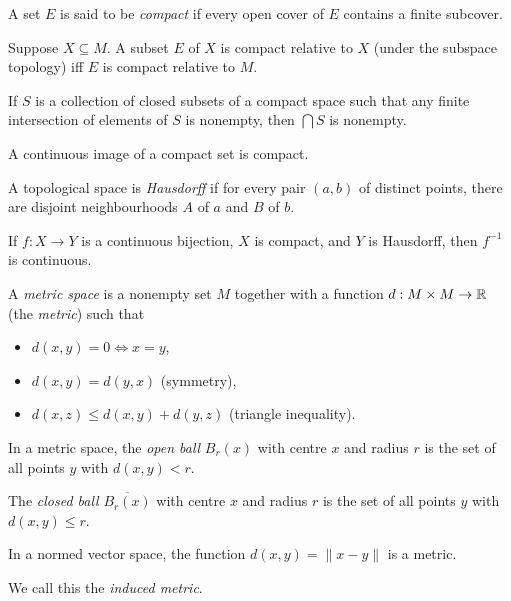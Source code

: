\begin{defn}
    A set $E$ is said to be \emph{compact} if every open cover of $E$ contains a
    finite subcover.
\end{defn}
\begin{prop}
  Suppose $X\subseteq M$. A subset $E$ of $X$ is compact
  relative to $X$ (under the subspace topology) iff $E$ is compact relative to $M$.
\end{prop}
\begin{prop}
  If $S$ is a collection of closed subsets of a compact space such that any
  finite intersection of elements of $S$ is nonempty, then $\bigcap S$ is
  nonempty.
\end{prop}
\begin{prop}
    A continuous image of a compact set is compact.
\end{prop}
\begin{defn}
    A topological space is \emph{Hausdorff} if for every pair $(a,b)$ of
    distinct points, there are disjoint neighbourhoods $A$ of $a$ and $B$ of $b$.
\end{defn}
\begin{prop}
    If $f:X\to Y$ is a continuous bijection, $X$ is compact, and $Y$ is
    Hausdorff, then $f^{-1}$ is continuous.
\end{prop}
\begin{defn}
  A \emph{metric space} is a nonempty set $M$ together with a function
  $d:M\times M\to\mathbb{R}$ (the \emph{metric}) such that
  \begin{itemize}
    \item $d(x,y)=0\iff x=y$,
    \item $d(x,y)=d(y,x)$ (symmetry), 
    \item $d(x,z)\le d(x,y)+d(y,z)$ (triangle inequality).
  \end{itemize}
\end{defn}
\begin{defn}
  In a metric space, the \emph{open ball} $B_r(x)$ with centre $x$ and radius $r$ is the
  set of all points $y$ with $d(x,y)<r$.

  The \emph{closed ball} $\overline{B_r(x)}$ with centre $x$ and radius $r$ is
  the set of all points $y$ with $d(x,y)\le r$.
\end{defn}
\begin{prop}
  In a normed vector space, the function $d(x,y)=\|x-y\|$ is a metric.
\end{prop}
\begin{defn}
  We call this the \emph{induced metric}.
\end{defn}
